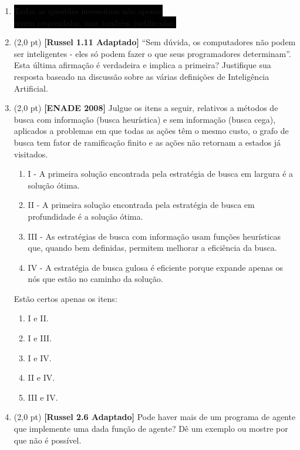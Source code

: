 \documentclass[12pt,a4paper,oneside]{article}
\begin{document}
\begin{enumerate}


	\item[] \colorbox{black}{
		\color{white}Todas as questões necessitam não apenas
	}\\ 
	\colorbox{black}{
		\color{white} serem respondidas, mas também justificadas.
	}

	\item (2,0 pt) {\bf [Russel 1.11 Adaptado]} ``Sem dúvida, os computadores não podem ser inteligentes - eles só podem fazer o que seus programadores determinam''. Esta última afirmação é verdadeira e implica a primeira? Justifique sua resposta baseado na discussão sobre as várias definições de Inteligência Artificial.
			
	\item (2,0 pt) {\bf [ENADE 2008]} Julgue os itens a seguir, relativos a métodos de busca com informação (busca heurística) e sem informação (busca cega), aplicados a problemas em que todas as ações têm o mesmo custo, o grafo de busca tem fator de ramificação finito e as ações não retornam a estados já visitados.
	
	\begin{enumerate}
		\item[] I - A primeira solução encontrada pela estratégia de busca em largura é a solução ótima.
		\item[] II - A primeira solução encontrada pela estratégia de busca em profundidade é a solução ótima.
		\item[] III - As estratégias de busca com informação usam funções heurísticas que, quando bem definidas, permitem
		melhorar a eficiência da busca.
		\item[] IV - A estratégia de busca gulosa é eficiente porque expande apenas os nós que estão no caminho da
		solução.
	\end{enumerate}
	
	Estão certos apenas os itens:
	
	\begin{enumerate}
		\item I e II.
		\item I e III.
		\item I e IV.
		\item II e IV.
		\item III e IV.
	\end{enumerate}
	
	 \item (2,0 pt) {\bf [Russel 2.6 Adaptado]} Pode haver mais de um programa de agente que implemente uma
	dada função de agente? Dê um exemplo ou mostre por que não é
	possível.
	

\end{enumerate}
\end{document}
